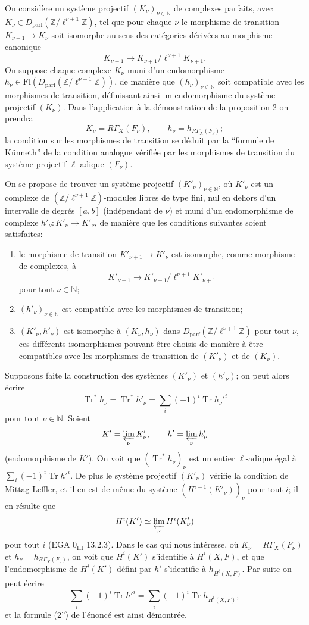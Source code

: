 \documentclass[11pt]{article}
\providecommand{\Tr}{\operatorname{Tr}}
\providecommand{\Tr}{\operatorname{Tr}}
\providecommand{\Tr}{\operatorname{Tr}}
\providecommand{\Tr}{\operatorname{Tr}}
\providecommand{\Tr}{\operatorname{Tr}}
\begin{document}
On considère un système projectif $(K_\nu)_{\nu\in\mathbb N}$ de complexes parfaits, avec $K_\nu\in D_{\mathrm{parf}}(\mathbb Z/\ell^{\nu+1}\mathbb Z)$, tel que pour chaque $\nu$ le morphisme de transition $K_{\nu+1}\to K_\nu$ soit isomorphe au sens des catégories dérivées au morphisme canonique
\[
K_{\nu+1}\to K_{\nu+1}/\ell^{\nu+1}K_{\nu+1}.
\]
On suppose chaque complexe $K_\nu$ muni d'un endomorphisme $h_\nu\in\mathrm{Fl}(D_{\mathrm{parf}}(\mathbb Z/\ell^{\nu+1}\mathbb Z))$, de manière que $(h_\nu)_{\nu\in\mathbb N}$ soit compatible avec les morphismes de transition, définissant ainsi un endomorphisme du système projectif $(K_\nu)$. Dans l'application à la démonstration de la proposition 2 on prendra
\[
K_\nu=R\Gamma_X(F_\nu),\qquad h_\nu=h_{R\Gamma_X(F_\nu)};
\]
la condition sur les morphismes de transition se déduit par la ``formule de Künneth'' de la condition analogue vérifiée par les morphismes de transition du système projectif $\ell$-adique $(F_\nu)$.

On se propose de trouver un système projectif $(K'_\nu)_{\nu\in\mathbb N}$, où $K'_\nu$ est un complexe de $(\mathbb Z/\ell^{\nu+1}\mathbb Z)$-modules libres de type fini, nul en dehors d'un intervalle de degrés $[a,b]$ (indépendant de $\nu$) et muni d'un endomorphisme de complexe $h'_\nu:K'_\nu\to K'_\nu$, de manière que les conditions suivantes soient satisfaites:
\begin{enumerate}[label=\arabic*)]
\item le morphisme de transition $K'_{\nu+1}\to K'_\nu$ est isomorphe, comme morphisme de complexes, à
\[
K'_{\nu+1}\to K'_{\nu+1}/\ell^{\nu+1}K'_{\nu+1}
\]
pour tout $\nu\in\mathbb N$;
\item $(h'_\nu)_{\nu\in\mathbb N}$ est compatible avec les morphismes de transition;
\item $(K'_\nu,h'_\nu)$ est isomorphe à $(K_\nu,h_\nu)$ dans $D_{\mathrm{parf}}(\mathbb Z/\ell^{\nu+1}\mathbb Z)$ pour tout $\nu$, ces différents isomorphismes pouvant être choisis de manière à être compatibles avec les morphismes de transition de $(K'_\nu)$ et de $(K_\nu)$.
\end{enumerate}
Supposons faite la construction des systèmes $(K'_\nu)$ et $(h'_\nu)$; on peut alors écrire
\[
\Tr^*h_\nu=\Tr^*h'_\nu=\sum_i(-1)^i\Tr h_\nu'^i
\]
pour tout $\nu\in\mathbb N$. Soient
\[
K'=\varprojlim_\nu K'_\nu,
\qquad h'=\varprojlim_\nu h'_\nu
\]
(endomorphisme de $K'$). On voit que $(\Tr^*h_\nu)_\nu$ est un entier $\ell$-adique égal à $\sum_i(-1)^i\Tr h'^i$. De plus le système projectif $(K'_\nu)$ vérifie la condition de Mittag-Leffler, et il en est de même du système $(H^{i-1}(K'_\nu))_\nu$ pour tout $i$; il en résulte que
\[
H^i(K')\simeq\varprojlim_\nu H^i(K'_\nu)
\]
pour tout $i$ (EGA $0_{\mathrm{III}}$ 13.2.3). Dans le cas qui nous intéresse, où $K_\nu=R\Gamma_X(F_\nu)$ et $h_\nu=h_{R\Gamma_X(F_\nu)}$, on voit que $H^i(K')$ s'identifie à $H^i(X,F)$, et que l'endomorphisme de $H^i(K')$ défini par $h'$ s'identifie à $h_{H^i(X,F)}$. Par suite on peut écrire
\[
\sum_i(-1)^i\Tr h'^i=
\sum_i(-1)^i\Tr h_{H^i(X,F)},
\]
et la formule (2'') de l'énoncé est ainsi démontrée.
\end{document}
